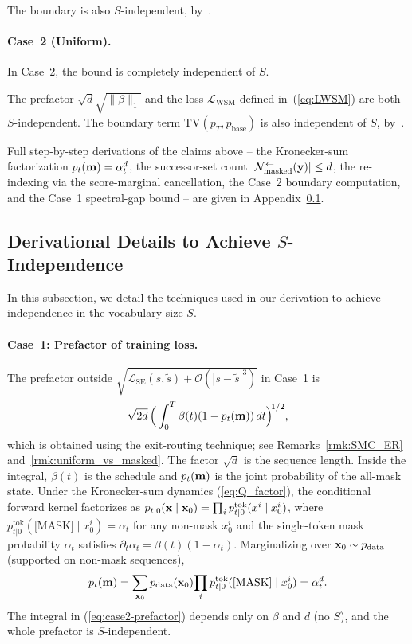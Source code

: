 \documentclass{article} %
\def\eqref#1{equation~\ref{#1}}
\newcommand{\bfx}{{\bf x}}
\newcommand{\bfy}{ {\bf y}}
\newcommand{\bfm}{{\bf m}}
\newcommand{\TV}{\mathrm{TV}}
\newcommand{\mask}{\text{[MASK]}}
\newcommand{\LWSM}{\mathcal{L}_{\mathrm{WSM}}}
\newcommand{\LSE}{\mathcal{L}_{\mathrm{SE}}}
\renewcommand{\eqref}[1]{\textup{(\ref{#1})}}
\newcommand{\Nmasked}{\mathcal{N}^{\leftarrow}_{\text{masked}}}
\begin{document}
The boundary 
is also $S$-independent, by~.


\paragraph{Case~2 (Uniform).} In Case~2, the bound is completely independent of $S$.

The prefactor $\sqrt{d}\sqrt{\|\beta\|_1}$
and the loss $\LWSM$ defined in~\eqref{eq:LWSM} are both $S$-independent.
The boundary term $\TV(p_T, p_{\mathrm{base}})$ is also independent of $S$, by~.

Full step-by-step
derivations of the claims above -- the Kronecker-sum factorization
$p_t(\bfm) = \alpha_t^d$, the successor-set count
$|\Nmasked(\bfy)| \le d$, the re-indexing via the
score-marginal cancellation, the Case~2 boundary computation, and the
Case~1 spectral-gap bound -- are given in
Appendix~\ref{ssec:bound_detail}.




\subsection{Derivational Details to Achieve \texorpdfstring{$S$}{S}-Independence}
\label{ssec:bound_detail}

In this subsection, we detail the techniques used in our derivation to achieve independence in the vocabulary size $S$.

\paragraph{Case~1: Prefactor of training loss.} The prefactor outside
$\sqrt{\LSE(s, \tilde{s}) + \mathcal{O}(|s-\tilde{s}|^3)}$ in Case~1 is
\begin{equation}
\sqrt{2d}\,\Big(\int_0^T \beta(t)(1 - p_t(\bfm))\,dt\Big)^{\!1/2},
\label{eq:case2-prefactor}
\end{equation}
which is obtained using the exit-routing technique; see Remarks~\ref{rmk:SMC_ER} and~\ref{rmk:uniform_vs_masked}.
The factor $\sqrt{d}$ is the sequence length. Inside the integral, $\beta(t)$
is the schedule and $p_t(\bfm)$ is the joint probability of the all-mask
state. Under the Kronecker-sum dynamics \eqref{eq:Q_factor}, the conditional
forward kernel factorizes as $p_{t|0}(\bfx \mid \bfx_0) = \prod_i
p^{\mathrm{tok}}_{t|0}(x^i \mid x_0^i)$, where $p^{\mathrm{tok}}_{t|0}(\mask \mid x_0^i)
= \alpha_t$ for any non-mask $x_0^i$ and the single-token mask probability
$\alpha_t$ satisfies $\partial_t \alpha_t = \beta(t)(1 - \alpha_t)$.
Marginalizing over $\bfx_0 \sim p_{\mathrm{data}}$ (supported on non-mask sequences),
\begin{equation}
p_t(\bfm) = \sum_{\bfx_0} p_{\mathrm{data}}(\bfx_0)\!\prod_i p^{\mathrm{tok}}_{t|0}(\mask \mid x_0^i) = \alpha_t^d.
\end{equation}
The integral in \eqref{eq:case2-prefactor} depends only on $\beta$ and
$d$ (no $S$), and the whole prefactor is $S$-independent.
\end{document}
